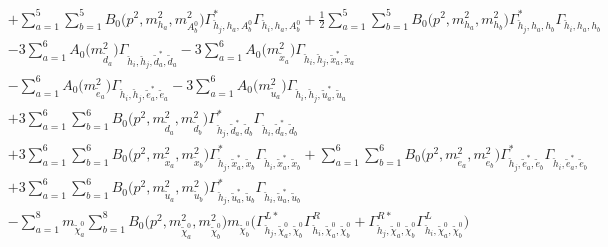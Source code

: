 \begin{itemize}
\begin{align}
 &+\sum_{a=1}^{5}\sum_{b=1}^{5}{B_0\Big(p^{2},m^2_{h_{{a}}},m^2_{A^0_{{b}}}\Big)} {\Gamma^*_{\check{h}_{{j}},h_{{a}},A^0_{{b}}}} {\Gamma_{\check{h}_{{i}},h_{{a}},A^0_{{b}}}} +\frac{1}{2} \sum_{a=1}^{5}\sum_{b=1}^{5}{B_0\Big(p^{2},m^2_{h_{{a}}},m^2_{h_{{b}}}\Big)} {\Gamma^*_{\check{h}_{{j}},h_{{a}},h_{{b}}}} {\Gamma_{\check{h}_{{i}},h_{{a}},h_{{b}}}}  \nonumber \\ 
 &-3 \sum_{a=1}^{6}{A_0\Big(m^2_{\tilde{d}_{{a}}}\Big)} {\Gamma_{\check{h}_{{i}},\check{h}_{{j}},\tilde{d}^*_{{a}},\tilde{d}_{{a}}}}  -3 \sum_{a=1}^{6}{A_0\Big(m^2_{\tilde{x}_{{a}}}\Big)} {\Gamma_{\check{h}_{{i}},\check{h}_{{j}},\tilde{x}^*_{{a}},\tilde{x}_{{a}}}}  \nonumber \\ 
 &- \sum_{a=1}^{6}{A_0\Big(m^2_{\tilde{e}_{{a}}}\Big)} {\Gamma_{\check{h}_{{i}},\check{h}_{{j}},\tilde{e}^*_{{a}},\tilde{e}_{{a}}}}  -3 \sum_{a=1}^{6}{A_0\Big(m^2_{\tilde{u}_{{a}}}\Big)} {\Gamma_{\check{h}_{{i}},\check{h}_{{j}},\tilde{u}^*_{{a}},\tilde{u}_{{a}}}}  \nonumber \\ 
 &+3 \sum_{a=1}^{6}\sum_{b=1}^{6}{B_0\Big(p^{2},m^2_{\tilde{d}_{{a}}},m^2_{\tilde{d}_{{b}}}\Big)} {\Gamma^*_{\check{h}_{{j}},\tilde{d}^*_{{a}},\tilde{d}_{{b}}}} {\Gamma_{\check{h}_{{i}},\tilde{d}^*_{{a}},\tilde{d}_{{b}}}}  \nonumber \\ 
 &+3 \sum_{a=1}^{6}\sum_{b=1}^{6}{B_0\Big(p^{2},m^2_{\tilde{x}_{{a}}},m^2_{\tilde{x}_{{b}}}\Big)} {\Gamma^*_{\check{h}_{{j}},\tilde{x}^*_{{a}},\tilde{x}_{{b}}}} {\Gamma_{\check{h}_{{i}},\tilde{x}^*_{{a}},\tilde{x}_{{b}}}}  +\sum_{a=1}^{6}\sum_{b=1}^{6}{B_0\Big(p^{2},m^2_{\tilde{e}_{{a}}},m^2_{\tilde{e}_{{b}}}\Big)} {\Gamma^*_{\check{h}_{{j}},\tilde{e}^*_{{a}},\tilde{e}_{{b}}}} {\Gamma_{\check{h}_{{i}},\tilde{e}^*_{{a}},\tilde{e}_{{b}}}} \nonumber \\ 
 &+3 \sum_{a=1}^{6}\sum_{b=1}^{6}{B_0\Big(p^{2},m^2_{\tilde{u}_{{a}}},m^2_{\tilde{u}_{{b}}}\Big)} {\Gamma^*_{\check{h}_{{j}},\tilde{u}^*_{{a}},\tilde{u}_{{b}}}} {\Gamma_{\check{h}_{{i}},\tilde{u}^*_{{a}},\tilde{u}_{{b}}}}  \nonumber \\ 
 &- \sum_{a=1}^{8}m_{\tilde{\chi}^0_{{a}}} \sum_{b=1}^{8}{B_0\Big(p^{2},m^2_{\tilde{\chi}^0_{{a}}},m^2_{\tilde{\chi}^0_{{b}}}\Big)} m_{\tilde{\chi}^0_{{b}}} \Big({\Gamma^{L*}_{\check{h}_{{j}},\tilde{\chi}^0_{{a}},\tilde{\chi}^0_{{b}}}} {\Gamma^R_{\check{h}_{{i}},\tilde{\chi}^0_{{a}},\tilde{\chi}^0_{{b}}}}  + {\Gamma^{R*}_{\check{h}_{{j}},\tilde{\chi}^0_{{a}},\tilde{\chi}^0_{{b}}}} {\Gamma^L_{\check{h}_{{i}},\tilde{\chi}^0_{{a}},\tilde{\chi}^0_{{b}}}} \Big)  \nonumber \\ 

\end{align}
\end{itemize}
